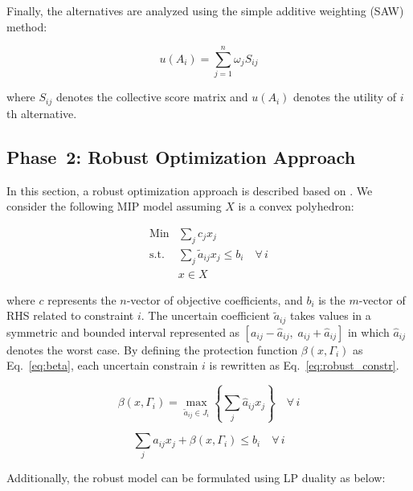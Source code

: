 \documentclass[10pt,twocolumn]{article}
\begin{document}
Finally, the alternatives are analyzed using the simple additive
weighting (SAW) method:

\begin{equation}
u(A_i) = \sum_{j=1}^{n} \omega_j S_{ij}
\label{eq:saw}
\end{equation}

where $S_{ij}$ denotes the collective score matrix and $u(A_i)$
denotes the utility of $i$th alternative.

\subsection{Phase~2: Robust Optimization Approach}

In this section, a robust optimization approach is described based
on \citet{Bertsimas2003,Bertsimas2004}. We consider the following
MIP model assuming $X$ is a convex polyhedron:

\begin{equation}
\begin{aligned}
  \text{Min} &\sum_j c_j x_j \\
  \text{s.t.} &\sum_j \tilde{a}_{ij} x_j \le b_i \quad \forall\, i \\
              &x \in X
\end{aligned}
\label{eq:robust_base}
\end{equation}

where $c$ represents the $n$-vector of objective coefficients, and
$b_i$ is the $m$-vector of RHS related to constraint $i$. The
uncertain coefficient $\tilde{a}_{ij}$ takes values in a symmetric
and bounded interval represented as $[a_{ij} - \hat{a}_{ij},\;
a_{ij} + \hat{a}_{ij}]$ in which $\hat{a}_{ij}$ denotes the worst
case. By defining the protection function $\beta(x, \Gamma_i)$ as
Eq.~\eqref{eq:beta}, each uncertain constrain $i$ is rewritten as
Eq.~\eqref{eq:robust_constr}.

\begin{equation}
\beta(x, \Gamma_i) = \max_{\tilde{a}_{ij} \in J_i}
  \left\{\sum_j \hat{a}_{ij} x_j\right\}
  \quad \forall\, i
\label{eq:beta}
\end{equation}

\begin{equation}
\sum_j a_{ij} x_j + \beta(x, \Gamma_i) \le b_i \quad \forall\, i
\label{eq:robust_constr}
\end{equation}

Additionally, the robust model can be formulated using LP duality
as below:
\end{document}
